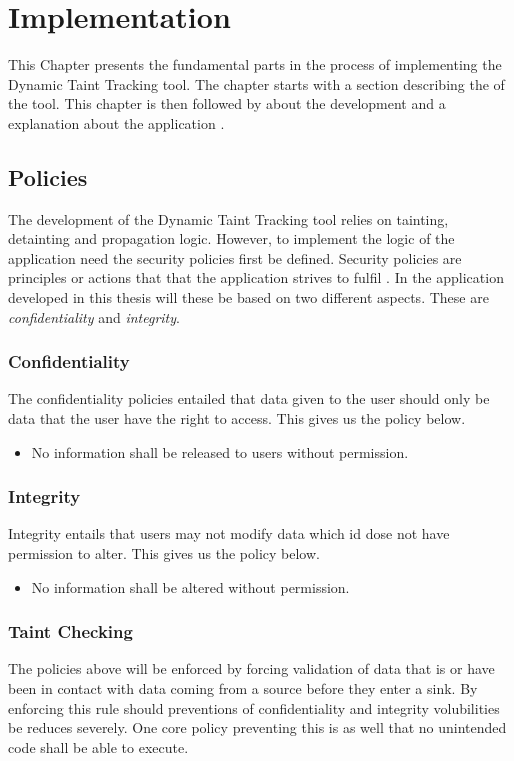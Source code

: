 \chapter{Implementation}
This Chapter presents the fundamental parts in the process of implementing the Dynamic Taint Tracking tool. The chapter starts with a section describing the \textit{} of the tool. This chapter is then followed by \textit{} about the development and a explanation about the application \textit{}.


\section{Policies}
\label{Policies}
The development of the Dynamic Taint Tracking tool relies on tainting, detainting and propagation logic. However, to implement the logic of the application need the security policies first be defined. Security policies are principles or actions that that the application strives to fulfil \parencite{BayukJenniferL2012Cspg}. In the application developed in this thesis will these be based on two different aspects. These are \textit{confidentiality} and \textit{integrity}.


\subsection{Confidentiality}
The confidentiality policies entailed that data given to the user should only be data that the user have the right to access. This gives us the policy below.

\hfill
\begin{itemize}
	\item No information shall be released to users without permission.
\end{itemize}
\hfill


\subsection{Integrity}
Integrity entails that users may not modify data which id dose not have permission to alter. This gives us the policy below.

\hfill
\begin{itemize}
	\item No information shall be altered without permission.
\end{itemize}
\hfill


\subsection{Taint Checking}
The policies above will be enforced by forcing validation of data that is or have been in contact with data coming from a source before they enter a sink. By enforcing this rule should preventions of confidentiality and integrity volubilities be reduces severely. One core policy preventing this is as well that no unintended code shall be able to execute.

